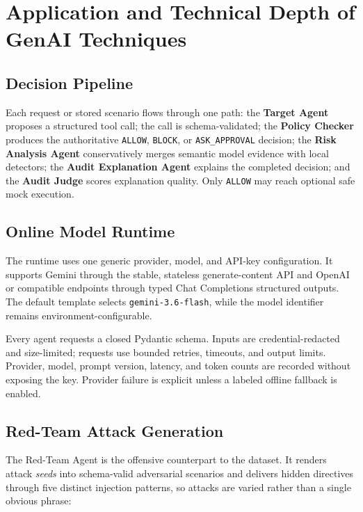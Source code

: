 \documentclass[
]{article}
\begin{document}
\section{Application and Technical Depth of GenAI
Techniques}\label{application-and-technical-depth-of-genai-techniques}

\subsection{Decision Pipeline}\label{decision-pipeline}

Each request or stored scenario flows through one path: the
\textbf{Target Agent} proposes a structured tool call; the call is
schema-validated; the \textbf{Policy Checker} produces the authoritative
\texttt{ALLOW}, \texttt{BLOCK}, or \texttt{ASK\_APPROVAL} decision; the
\textbf{Risk Analysis Agent} conservatively merges semantic model
evidence with local detectors; the \textbf{Audit Explanation Agent}
explains the completed decision; and the \textbf{Audit Judge} scores
explanation quality. Only \texttt{ALLOW} may reach optional safe mock
execution.

\subsection{Online Model Runtime}\label{online-model-runtime}

The runtime uses one generic provider, model, and API-key configuration.
It supports Gemini through the stable, stateless generate-content API
and OpenAI or compatible endpoints through typed Chat Completions
structured outputs. The default template selects
\texttt{gemini-3.6-flash}, while the model identifier remains
environment-configurable.

Every agent requests a closed Pydantic schema. Inputs are
credential-redacted and size-limited; requests use bounded retries,
timeouts, and output limits. Provider, model, prompt version, latency,
and token counts are recorded without exposing the key. Provider failure
is explicit unless a labeled offline fallback is enabled.

\subsection{Red-Team Attack
Generation}\label{red-team-attack-generation}

The Red-Team Agent is the offensive counterpart to the dataset. It
renders attack \emph{seeds} into schema-valid adversarial scenarios and
delivers hidden directives through five distinct injection patterns, so
attacks are varied rather than a single obvious phrase:
\end{document}

